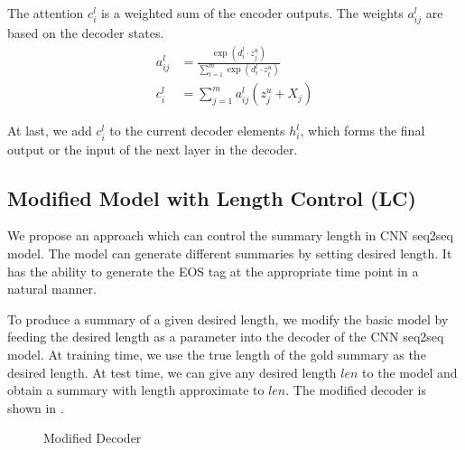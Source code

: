 The attention $c^l_{i}$ is a weighted sum of the encoder outputs.
The weights $a^l_{ij}$ are based on the decoder states.
\begin{align}
a^l_{ij} \!&=\! \frac {\exp(d^l_{i}\cdot z^u_{j})}{\sum^m_{t=1} \exp(d^l_{i}\cdot z^u_{t})} \\
c^l_{i}  \!&=\! \sum^m_{j=1} a^l_{ij}(z^u_{j}+X_{j})
\end{align}

At last, we add $c^l_{i}$ to the current decoder elements $h^l_{i}$,
which forms the final output or the
input of the next layer in the decoder.

\subsection{Modified Model with Length Control (LC)}
We propose an approach which can control the summary length
in CNN seq2seq model.  The model can generate different summaries by
setting desired length. It has the ability to generate the EOS tag at the appropriate time
point in a natural manner.


To produce a summary of a given desired length,
we modify the basic model by feeding the desired length as
a parameter into the decoder of the CNN seq2seq model.
At training time, we use the true length of the gold summary as the
desired length. At test time, we can give any desired length $len$
to the model and obtain
a summary with length approximate to $len$.
The modified decoder is shown in .

\begin{figure}[th]
\centering
{}
\caption{Modified Decoder}
\label{fig:model}
\end{figure}


